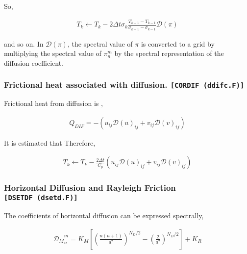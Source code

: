 So,

\begin{eqnarray}
  T_k \leftarrow  T_k
       -  2 \Delta t
        \sigma_{k} \frac{T_{k+1}-T_{k-1}}{\sigma_{k+1} - \sigma_{k-1}}
        {\mathcal D}(\pi)
\end{eqnarray}

and so on. In \({\mathcal D}(\pi)\), the spectral value of \(\pi\) is
converted to a grid by multiplying the spectral value of \(\pi_n^m\) by
the spectral representation of the diffusion coefficient.

\hypertarget{frictional-heat-associated-with-diffusion.-cordif-ddifc.f}{%
\subsubsection{\texorpdfstring{Frictional heat associated with
diffusion.
\texttt{{[}CORDIF\ (ddifc.F){]}}}{Frictional heat associated with diffusion. {[}CORDIF (ddifc.F){]}}}\label{frictional-heat-associated-with-diffusion.-cordif-ddifc.f}}

Frictional heat from diffusion is ,

\begin{eqnarray}
  Q_{DIF} = - \left( u_{ij} {\mathcal D}(u)_{ij}
                   + v_{ij} {\mathcal D}(v)_{ij} \right)
\end{eqnarray}

It is estimated that Therefore,

\begin{eqnarray}
  T_k \leftarrow  T_k
       -  \frac{2 \Delta t}{C_p}
           \left( u_{ij} {\mathcal D}(u)_{ij}
                 + v_{ij} {\mathcal D}(v)_{ij} \right)
\end{eqnarray}

\hypertarget{horizontal-diffusion-and-rayleigh-friction-dsetdf-dsetd.f}{%
\subsubsection{\texorpdfstring{Horizontal Diffusion and Rayleigh
Friction
\texttt{{[}DSETDF\ (dsetd.F){]}}}{Horizontal Diffusion and Rayleigh Friction {[}DSETDF (dsetd.F){]}}}\label{horizontal-diffusion-and-rayleigh-friction-dsetdf-dsetd.f}}

The coefficients of horizontal diffusion can be expressed spectrally,

\begin{eqnarray}
 {{\mathcal D}_M}_n^m = K_M
                      \left[ \left( \frac{n(n+1)}{a^2} \right)^{N_D/2}
                                - \left( \frac{2}{a^2} \right)^{N_D/2}
                      \right]
                  + K_R
\end{eqnarray}

